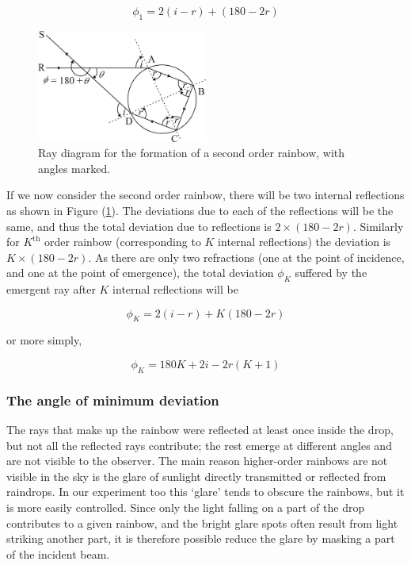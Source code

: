 \begin{equation}
\phi_{1}=2(i-r)+(180-2r)
\end{equation}


\begin{figure}[!htb]
    \centering
    \includegraphics[width=0.5\textwidth]{figs/img4.jpg}
    \caption{Ray diagram for the formation of a second order rainbow, with angles marked.}
    \label{fig:secondorder}
\end{figure}


If we now consider the second order rainbow, there will be two internal reflections as shown in Figure (\ref{fig:secondorder}). The deviations due to each of the reflections will be the same, and thus the total deviation due to reflections is $2\times (180 - 2r)$. Similarly for $K^\text{th}$ order rainbow (corresponding to $K$ internal reflections) the deviation is $K\times(180 - 2r)$. As there are only two refractions (one at the point of incidence, and one at the point of emergence), the total deviation $\phi_K$ suffered by the emergent ray after $K$ internal reflections will be

\begin{equation*}
    \phi_K = 2(i-r) + K(180-2r)
\end{equation*}

or more simply, 

\begin{equation}
    \phi_K = 180K + 2i - 2r(K+1)
    \label{mindevK}
\end{equation}


\subsubsection*{The angle of minimum deviation}

The rays that make up the rainbow were reflected at least once inside the drop, but not all the reflected rays contribute; the rest emerge at different angles and are not visible to the observer. The main reason higher-order rainbows are not visible in the sky is the glare of sunlight directly transmitted or reflected from raindrops. In our experiment too this `glare' tends to obscure the rainbows, but it is more easily controlled. Since only the light falling on a part of the drop contributes to a given rainbow, and the bright glare spots often result from light striking another part, it is therefore possible reduce the glare by masking a part of the incident beam.

